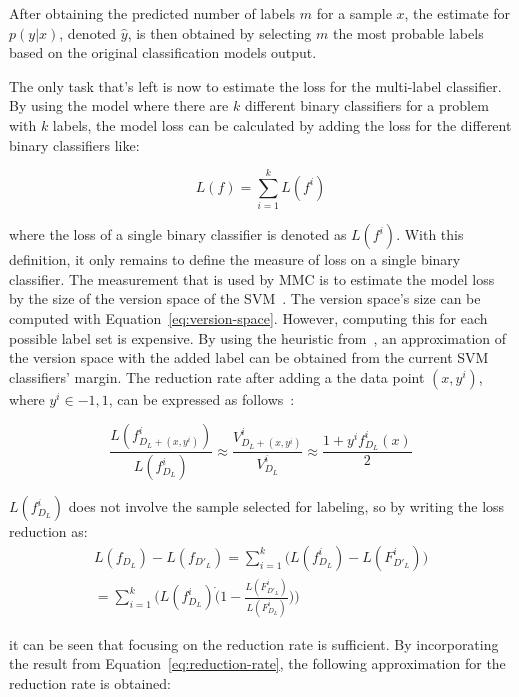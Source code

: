 After obtaining the predicted number of labels $m$ for a sample $x$, the estimate for $p(y|x)$, denoted $\hat{y}$, is then obtained by selecting $m$ the most probable labels based on the original classification models output.

The only task that's left is now to estimate the loss for the multi-label classifier.
By using the model where there are $k$ different binary classifiers for a problem with $k$ labels, the model loss can be calculated by adding the loss for the different binary classifiers like:

\begin{equation}
    L(f) = \sum_{i = 1}^k L(f^i)
\end{equation}

where the loss of a single binary classifier is denoted as $L(f^i)$.
With this definition, it only remains to define the measure of loss on a single binary classifier.
The measurement that is used by MMC is to estimate the model loss by the size of the version space of the SVM~\cite{tong2001support, yang2009effective}.
The version space's size can be computed with Equation~\ref{eq:version-space}.
However, computing this for each possible label set is expensive.
By using the heuristic from~\cite{tong2001active}, an approximation of the version space with the added label can be obtained from the current SVM classifiers' margin.
The reduction rate after adding a the data point $(x, y^i)$, where $y^i \in {-1, 1}$, can be expressed as follows~\cite{yang2009effective, tong2001active}:

\begin{equation}\label{eq:reduction-rate}
    \frac{L(f^i_{D_L+(x, y^i)})}{L(f^i_{D_L})} \approx \frac{V^i_{D_L + (x, y^i)}}{V^i_{D_L}} \approx \frac{1 + y^i f^i_{D_L}(x)}{2}
\end{equation}

$L(f^i_{D_L})$ does not involve the sample selected for labeling, so by writing the loss reduction as:
\begin{equation}
    \begin{split}
        L(f_{D_L}) - L(f_{D'_L}) = \sum_{i=1}^k\big ( L(f^i_{D_L}) - L(F^i_{D'_L}) \big )\\
        = \sum_{i=1}^k\big ( L(f^i_{D_L}) \dot (1 - \frac{L(F^i_{D'_L})}{L(F^i_{D_L})}) \big )
    \end{split}
\end{equation}

it can be seen that focusing on the reduction rate is sufficient.
By incorporating the result from Equation~\ref{eq:reduction-rate}, the following approximation for the reduction rate is obtained:

